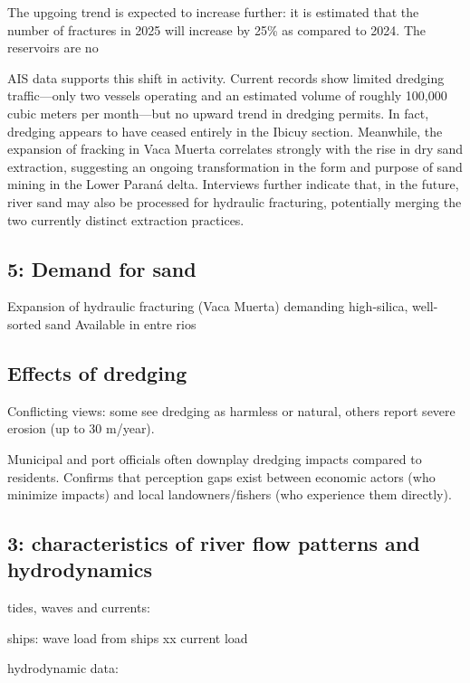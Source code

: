 The upgoing trend is expected to increase further: it is estimated that the number of fractures in 2025 will increase by 25\% as compared to 2024. The reservoirs are no

AIS data supports this shift in activity. Current records show limited dredging traffic—only two vessels operating and an estimated volume of roughly 100,000 cubic meters per month—but no upward trend in dredging permits. In fact, dredging appears to have ceased entirely in the Ibicuy section. Meanwhile, the expansion of fracking in Vaca Muerta correlates strongly with the rise in dry sand extraction, suggesting an ongoing transformation in the form and purpose of sand mining in the Lower Paraná delta. Interviews further indicate that, in the future, river sand may also be processed for hydraulic fracturing, potentially merging the two currently distinct extraction practices.


\subsection{5: Demand for sand}
Expansion of hydraulic fracturing (Vaca Muerta) demanding high-silica, well-sorted sand
Available in entre rios

\subsection{Effects of dredging}
Conflicting views: some see dredging as harmless or natural, others report severe erosion (up to 30 m/year).

Municipal and port officials often downplay dredging impacts compared to residents.
Confirms that perception gaps exist between economic actors (who minimize impacts) and local landowners/fishers (who experience them directly).

\subsection{3: characteristics of river flow patterns and hydrodynamics}
tides, waves and currents: 

ships: wave load from ships xx
current load

hydrodynamic data: 


